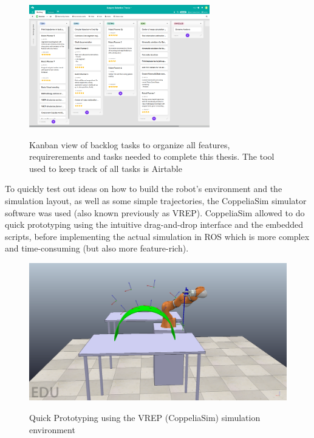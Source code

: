\begin{center}
\begin{figure}[!htb]
\centering
\includegraphics[width=0.7\textwidth]{images/task-backlog-airtable.png}\\
\caption{Kanban view of backlog tasks to organize all features, requirerements and tasks needed to complete this thesis. The tool used to keep track of all tasks is Airtable}
\end{figure}
\end{center}

To quickly test out ideas on how to build the robot's environment and the simulation layout, as well as some simple trajectories, the CoppeliaSim simulator software was used (also known previously as VREP).
CoppeliaSim allowed to do quick prototyping using the intuitive drag-and-drop interface and the embedded scripts, before implementing the actual simulation in ROS which is more complex and time-consuming (but also more
feature-rich).

\begin{center}
\begin{figure}[!htb]
\centering
\includegraphics[width=\textwidth]{images/quick-vrep-prototyping.png}\\
\caption{Quick Prototyping using the VREP (CoppeliaSim) simulation environment}
\end{figure}
\end{center}